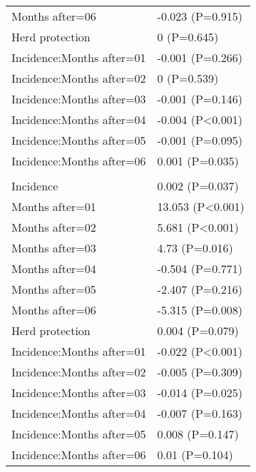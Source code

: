 \documentclass[]{article}
\begin{document}
\begin{longtable}[t]{ll}
\hspace{1em}Months after=06 & -0.023 (P=0.915)\\
\hspace{1em}Herd protection & 0 (P=0.645)\\
\hspace{1em}Incidence:Months after=01 & -0.001 (P=0.266)\\
\hspace{1em}Incidence:Months after=02 & 0 (P=0.539)\\
\hspace{1em}Incidence:Months after=03 & -0.001 (P=0.146)\\
\hspace{1em}Incidence:Months after=04 & -0.004 (P<0.001)\\
\hspace{1em}Incidence:Months after=05 & -0.001 (P=0.095)\\
\hspace{1em}Incidence:Months after=06 & 0.001 (P=0.035)\\
\addlinespace[1.5em]
\multicolumn{2}{l}{\textbf{Temporary not field worker}}\\
\hspace{1em}Incidence & 0.002 (P=0.037)\\
\hspace{1em}Months after=01 & 13.053 (P<0.001)\\
\hspace{1em}Months after=02 & 5.681 (P<0.001)\\
\hspace{1em}Months after=03 & 4.73 (P=0.016)\\
\hspace{1em}Months after=04 & -0.504 (P=0.771)\\
\hspace{1em}Months after=05 & -2.407 (P=0.216)\\
\hspace{1em}Months after=06 & -5.315 (P=0.008)\\
\hspace{1em}Herd protection & 0.004 (P=0.079)\\
\hspace{1em}Incidence:Months after=01 & -0.022 (P<0.001)\\
\hspace{1em}Incidence:Months after=02 & -0.005 (P=0.309)\\
\hspace{1em}Incidence:Months after=03 & -0.014 (P=0.025)\\
\hspace{1em}Incidence:Months after=04 & -0.007 (P=0.163)\\
\hspace{1em}Incidence:Months after=05 & 0.008 (P=0.147)\\
\hspace{1em}Incidence:Months after=06 & 0.01 (P=0.104)\\*
\end{longtable}
\end{document}
